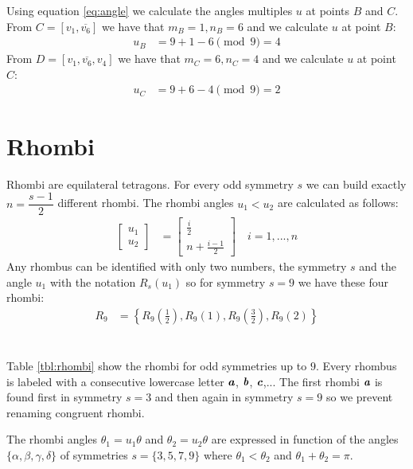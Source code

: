 \documentclass[11pt]{article}
\def\mathbi#1{\textbf{\em #1}}
\begin{document}
Using equation \ref{eq:angle} we calculate the angles multiples $u$ at points $B$ and $C$. From $C=[v_1,\overline{v_6}]$ we have that $m_B=1,n_B=6$ and we calculate $u$ at point $B$:
\begin{align}
u_B &= 9 + 1 - 6 \pmod{9} = 4
\end{align}
From $D = [v_1,\overline{v_6},v_4]$ we have that $m_C=6,n_C=4$ and we calculate $u$ at point $C$:
\begin{align}
u_C &= 9 + 6 - 4 \pmod{9} = 2
\end{align}

\section{Rhombi}

Rhombi are equilateral tetragons. For every odd symmetry $s$ we can build exactly $n = \dfrac{s-1}2$ different rhombi. The rhombi angles $u_1 < u_2$ are calculated as follows:
\begin{align}
\left[ \begin{array}{c} u_1 \\ u_2 \end{array} \right]
 &= \left[ \begin{array}{c} \frac{i}2 \\ n + \frac{i-1}2 \end{array} \right]
 \quad i = 1,...,n
\end{align}
Any rhombus can be identified with only two numbers, the symmetry $s$ and the angle $u_1$ with the notation $R_s(u_1)$ so for symmetry $s=9$ we have these four rhombi:
\begin{align}
R_9 &= \left\{ R_9\left(\frac{1}2\right), R_9(1), R_9\left(\frac{3}2\right), R_9(2) \right\}
\end{align}
\\\\
Table \ref{tbl:rhombi} show the rhombi for odd symmetries up to $9$. Every rhombus is labeled with a consecutive lowercase letter $\mathbi{a}$, $\mathbi{b}$, $\mathbi{c}$,... The first rhombi $\mathbi{a}$ is found first in symmetry $s=3$ and then again in symmetry $s=9$ so we prevent renaming congruent rhombi.

The rhombi angles $\theta_1 = u_1\theta$ and $\theta_2 = u_2\theta$ are expressed in function of the angles $\{\alpha,\beta,\gamma,\delta\}$ of symmetries $s=\{3,5,7,9\}$ where $\theta_1 < \theta_2$ and $\theta_1 + \theta_2 = \pi$.
\end{document}
